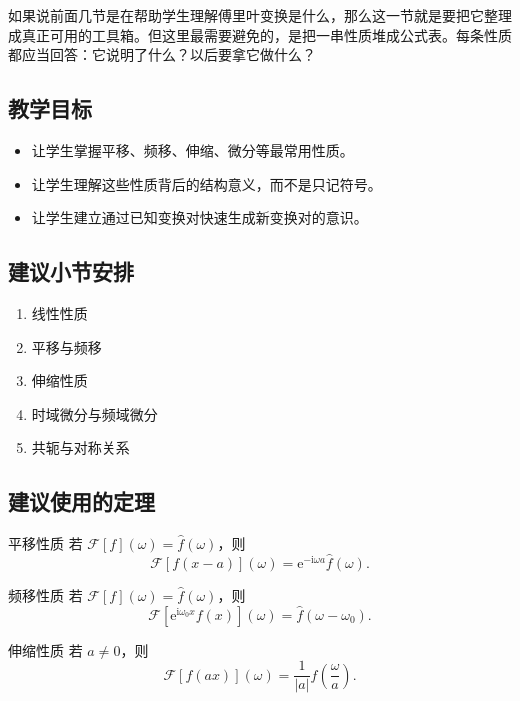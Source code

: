 \begin{wulibj}[本节要解决的问题]
如果说前面几节是在帮助学生理解傅里叶变换是什么，那么这一节就是要把它整理成真正可用的工具箱。但这里最需要避免的，是把一串性质堆成公式表。每条性质都应当回答：它说明了什么？以后要拿它做什么？
\end{wulibj}

\subsection*{教学目标}
\begin{itemize}
    \item 让学生掌握平移、频移、伸缩、微分等最常用性质。
    \item 让学生理解这些性质背后的结构意义，而不是只记符号。
    \item 让学生建立通过已知变换对快速生成新变换对的意识。
\end{itemize}

\subsection*{建议小节安排}
\begin{enumerate}
    \item 线性性质
    \item 平移与频移
    \item 伸缩性质
    \item 时域微分与频域微分
    \item 共轭与对称关系
\end{enumerate}

\subsection*{建议使用的定理}
\begin{dingli}{平移性质}{}
若 $\mathcal{F}[f](\omega)=\hat{f}(\omega)$，则
\[
    \mathcal{F}[f(x-a)](\omega)=\mathrm{e}^{-\mathrm{i}\omega a}\hat{f}(\omega).
\]
\end{dingli}

\begin{dingli}{频移性质}{}
若 $\mathcal{F}[f](\omega)=\hat{f}(\omega)$，则
\[
    \mathcal{F}\!\left[\mathrm{e}^{\mathrm{i}\omega_0 x}f(x)\right](\omega)=\hat{f}(\omega-\omega_0).
\]
\end{dingli}

\begin{dingli}{伸缩性质}{}
若 $a\neq 0$，则
\[
    \mathcal{F}[f(ax)](\omega)=\frac{1}{|a|}\hat{f}\!\left(\frac{\omega}{a}\right).
\]
\end{dingli}

